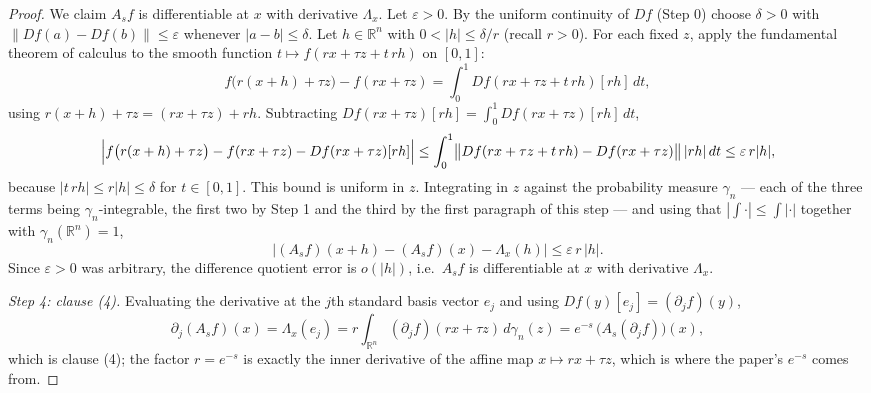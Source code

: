 \begin{proof}
We claim $A_s f$ is differentiable at $x$ with derivative $\Lambda_x$.  Let
$\varepsilon > 0$.  By the uniform continuity of $Df$ (Step 0) choose
$\delta > 0$ with $\|Df(a) - Df(b)\| \leq \varepsilon$ whenever $|a-b| \leq \delta$.
Let $h \in \mathbb{R}^n$ with $0 < |h| \leq \delta/r$ (recall $r > 0$).  For each
fixed $z$, apply the fundamental theorem of calculus to the smooth function
$t \mapsto f(rx+\tau z + t\,rh)$ on $[0,1]$:
\[
  f\bigl(r(x+h)+\tau z\bigr) - f(rx+\tau z)
    = \int_0^1 Df(rx+\tau z + t\,rh)[rh] \, dt ,
\]
using $r(x+h)+\tau z = (rx+\tau z) + rh$.  Subtracting
$Df(rx+\tau z)[rh] = \int_0^1 Df(rx+\tau z)[rh]\,dt$,
\[
  \Bigl| f\bigl(r(x+h)+\tau z\bigr) - f(rx+\tau z) - Df(rx+\tau z)[rh] \Bigr|
    \leq \int_0^1 \bigl\|Df(rx+\tau z+t\,rh) - Df(rx+\tau z)\bigr\|\,|rh|\,dt
    \leq \varepsilon\, r|h| ,
\]
because $|t\,rh| \leq r|h| \leq \delta$ for $t \in [0,1]$.  This bound is uniform
in $z$.  Integrating in $z$ against the probability measure $\gamma_n$ --- each
of the three terms being $\gamma_n$-integrable, the first two by Step 1 and the
third by the first paragraph of this step --- and using that $|\int\cdot| \leq
\int|\cdot|$ together with $\gamma_n(\mathbb{R}^n) = 1$,
\[
  \bigl|(A_s f)(x+h) - (A_s f)(x) - \Lambda_x(h)\bigr| \leq \varepsilon\,r\,|h| .
\]
Since $\varepsilon > 0$ was arbitrary, the difference quotient error is
$o(|h|)$, i.e.\ $A_s f$ is differentiable at $x$ with derivative $\Lambda_x$.

\emph{Step 4: clause (4).}
Evaluating the derivative at the $j$th standard basis vector $e_j$ and using
$Df(y)[e_j] = (\partial_j f)(y)$,
\[
  \partial_j(A_s f)(x) = \Lambda_x(e_j)
    = r\int_{\mathbb{R}^n} (\partial_j f)(rx+\tau z)\,d\gamma_n(z)
    = e^{-s}\,\bigl(A_s(\partial_j f)\bigr)(x) ,
\]
which is clause (4); the factor $r = e^{-s}$ is exactly the inner derivative of
the affine map $x \mapsto rx + \tau z$, which is where the paper's $e^{-s}$ comes
from.
\end{proof}
